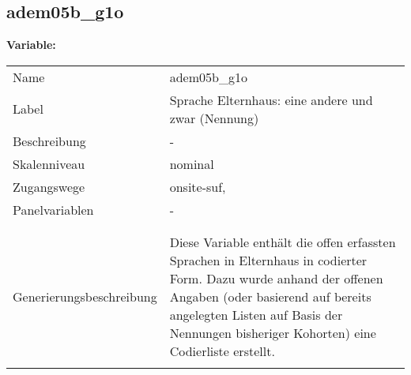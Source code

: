 	
	
	\subsection{adem05b\_g1o}
	\label{subSection:adem05b_g1o}

	\noindent\textbf{Variable:}\\
		\begin{tabular}{lL{11.3cm}}
			\label{tableVariable:adem05b_g1o}
			Name & adem05b\_g1o \\
			Label & Sprache Elternhaus: eine andere und zwar (Nennung) \\
			Beschreibung & - \\
			Skalenniveau & nominal \\
			Zugangswege &
				onsite-suf,
 \\
			Panelvariablen & -
			 \\
			 \\
 \\
					Generierungsbeschreibung & Diese Variable enthält die offen erfassten Sprachen in Elternhaus in codierter Form. Dazu wurde anhand der offenen Angaben (oder basierend auf bereits angelegten Listen auf Basis der Nennungen bisheriger Kohorten) eine Codierliste erstellt.
				 \\	
			 \\
		\end{tabular}






